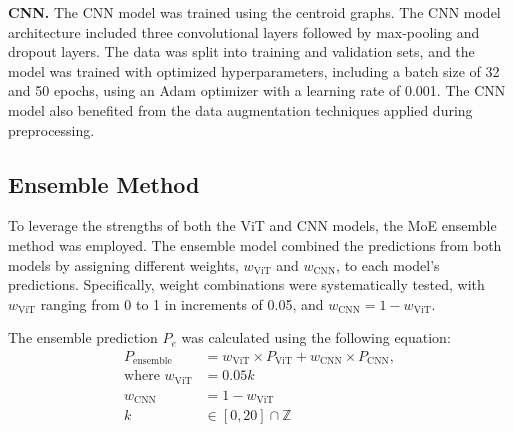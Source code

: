 \textbf{CNN.}
The CNN model was trained using the centroid graphs. The CNN model architecture included three convolutional layers followed by max-pooling and dropout layers. The data was split into training and validation sets, and the model was trained with optimized hyperparameters, including a batch size of 32 and 50 epochs, using an Adam optimizer with a learning rate of 0.001. The CNN model also benefited from the data augmentation techniques applied during preprocessing.


\subsection{Ensemble Method}
To leverage the strengths of both the ViT and CNN models, the MoE ensemble method was employed. The ensemble model combined the predictions from both models by assigning different weights, $w_{\text{ViT}}$ and $w_{\text{CNN}}$, to each model's predictions. Specifically, weight combinations were systematically tested, with $w_{\text{ViT}}$ ranging from 0 to 1 in increments of 0.05, and $w_{\text{CNN}} = 1 - w_{\text{ViT}}$.

The ensemble prediction $P_{e}$ was calculated using the following equation:
\begin{equation}
\begin{split}    
P_{\text{ensemble}} & = w_{\text{ViT}} \times P_{\text{ViT}} + w_{\text{CNN}} \times P_{\text{CNN}}, \\
\text{where } w_{\text{ViT}} & = 0.05k \\
w_{\text{CNN}} & = 1 - w_{\text{ViT}} \\
k & \in [0, 20] \cap \mathbb{Z}
\end{split}
\end{equation}
\\
